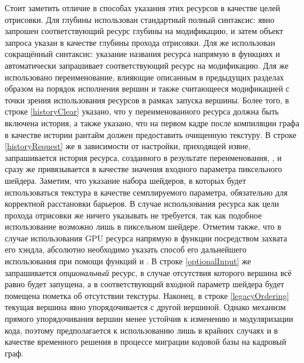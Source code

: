 Стоит заметить отличие в способах указания этих ресурсов в качестве целей отрисовки.
Для глубины использован стандартный полный синтаксис: явно запрошен соответствующий ресурс глубины на модификацию, и затем объект запроса указан в качестве глубины прохода отрисовки.
Для  же использован сокращённый синтаксис: указание названия ресурса напрямую в функциях  и  автоматически запрашивает соответствующий ресурс на модификацию.
Для  же использовано переименование, влияющие описанным в предыдущих разделах образом на порядок исполнения вершин и также считающееся модификацией с точки зрения использования ресурсов в рамках запуска вершины.
Более того, в строке \ref{historyClear} указано, что у переименованного ресурса должна быть включена история, а также указано, что на первом кадре после компиляции графа в качестве истории рантайм должен предоставить очищенную текстуру.
В строке \ref{historyRequest} же в зависимости от настройки, приходящей извне, запрашивается история ресурса, созданного в результате переименования, , и сразу же привязывается в качестве значения входного параметра  пиксельного шейдера.
Заметим, что указание набора шейдеров, в которых будет использоваться текстура в качестве семплируемого параметра, обязательно для корректной расстановки барьеров.
В случае использования ресурса как цели прохода отрисовки же ничего указывать не требуется, так как подобное использование возможно лишь в пиксельном шейдере.
Отметим также, что в случае использования GPU ресурса напрямую в функции посредством захвата его хэндла, абсолютно необходимо указать способ его дальнейшего использования при помощи функций  и .
В строке \ref{optionalInput} же запрашивается \textit{опциональный} ресурс, в случае отсутствия которого вершина всё равно будет запущена, а в соответствующий входной параметр шейдера будет помещена пометка об отсутствии текстуры.
Наконец, в строке \ref{legacyOrdering} текущая вершина явно упорядочивается с другой вершиной.
Однако механизм прямого упорядочивания вершин менее устойчив к изменению и модуляризации кода, поэтому предполагается к использованию лишь в крайних случаях и в качестве временного решения в процессе миграции кодовой базы на кадровый граф.

